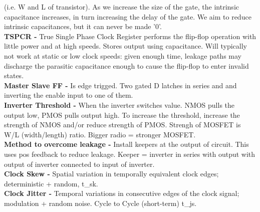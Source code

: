 \documentclass[9pt,fleqn]{article}
\begin{document}
\begin{multicols}{3}
    (i.e. W and L of transistor).  As we increase the size of the gate, the
    intrinsic capacitance increases, in turn increasing the delay of the gate.
    We aim to reduce intrinsic capacitances, but it can never be made '0'.\\
    \textbf{TSPCR -} True Single Phase Clock Register performs the flip-flop
    operation with little power and at high speeds. Stores output using
    capacitance. Will typically not work at static or low clock speeds: given
    enough time, leakage paths may discharge the parasitic capacitance enough
    to cause the flip-flop to enter invalid states.\\
    \textbf{Master Slave FF -} Is edge trigged. Two gated D latches in series
    and and inverting the enable input to one of them.\\
    \textbf{Inverter Threshold -} When the inverter switches value. NMOS pulls
    the output low, PMOS pulls output high. To increase the threshold,
    increase the strength of NMOS and/or reduce strength of PMOS. Strengh of
    MOSFET is W/L (width/length) ratio. Bigger radio = stronger MOSFET.\\
    \textbf{Method to overcome leakage -} Install keepers at the output of
    circuit. This uses pos feedback to reduce leakage. Keeper = inverter in
    series with output with output of inverter connected to input of inverter.\\
    \textbf{Clock Skew -} Spatial variation in temporally equivalent clock
    edges; deterministic + random, t\_sk. \\
    \textbf{Clock Jitter -} Temporal variations in consecutive edges of the
    clock signal; modulation + random noise. Cycle to Cycle (short-term) t\_js.

\end{multicols}
\end{document}
